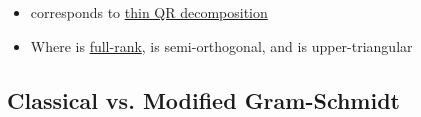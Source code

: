 \begin{itemize}
            \begin{itemize}

                  \item
                        corresponds to \underline{thin QR decomposition}
                  \item
                        Where  is \underline{full-rank},
                         is semi-orthogonal,
                        and  is upper-triangular
            \end{itemize}
\end{itemize}

\subsection*{Classical vs. Modified Gram-Schmidt}

